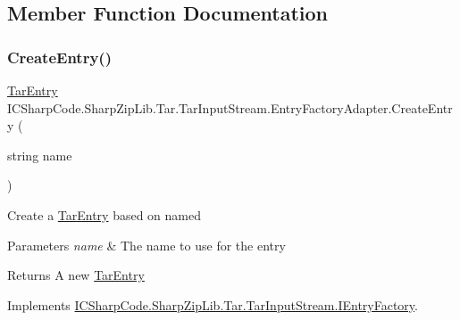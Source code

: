 \subsection{Member Function Documentation}
\mbox{\label{class_i_c_sharp_code_1_1_sharp_zip_lib_1_1_tar_1_1_tar_input_stream_1_1_entry_factory_adapter_ae6f5f3df4f39bc1f87f2307d32a5ca04}} 
\subsubsection{\texorpdfstring{Create\+Entry()}{CreateEntry()}\hspace{0.1cm}{\footnotesize\ttfamily [1/2]}}
{\footnotesize\ttfamily \hyperlink{class_i_c_sharp_code_1_1_sharp_zip_lib_1_1_tar_1_1_tar_entry}{Tar\+Entry} I\+C\+Sharp\+Code.\+Sharp\+Zip\+Lib.\+Tar.\+Tar\+Input\+Stream.\+Entry\+Factory\+Adapter.\+Create\+Entry (\begin{DoxyParamCaption}\item[{string}]{name }\end{DoxyParamCaption})\hspace{0.3cm}{\ttfamily [inline]}}



Create a \hyperlink{class_i_c_sharp_code_1_1_sharp_zip_lib_1_1_tar_1_1_tar_entry}{Tar\+Entry} based on named 


\begin{DoxyParams}{Parameters}
{\em name} & The name to use for the entry\\
\hline
\end{DoxyParams}
\begin{DoxyReturn}{Returns}
A new \hyperlink{class_i_c_sharp_code_1_1_sharp_zip_lib_1_1_tar_1_1_tar_entry}{Tar\+Entry}
\end{DoxyReturn}


Implements \hyperlink{interface_i_c_sharp_code_1_1_sharp_zip_lib_1_1_tar_1_1_tar_input_stream_1_1_i_entry_factory_a2534ff030c9132b43c76e4ad812558f9}{I\+C\+Sharp\+Code.\+Sharp\+Zip\+Lib.\+Tar.\+Tar\+Input\+Stream.\+I\+Entry\+Factory}.

